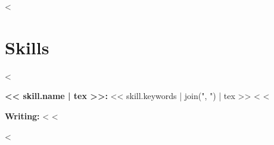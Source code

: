 <%

\section{Skills}
\begin{description}
<%
  \item \textbf{<< skill.name | tex >>:} << skill.keywords | join(", ") | tex >>
<%
<%
  \item \textbf{Writing:} <%
<%
\end{description}

<%
